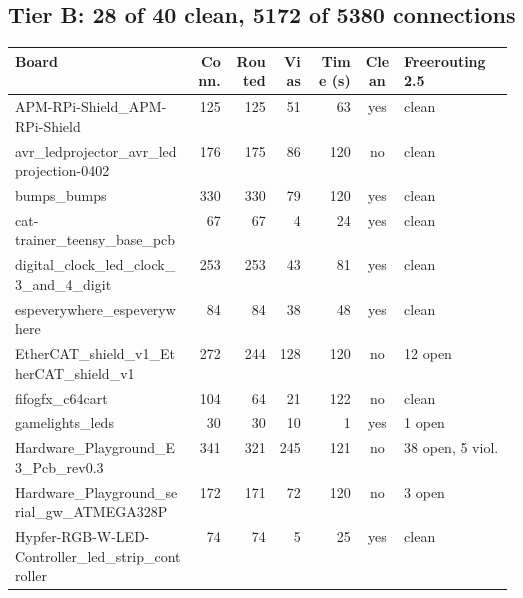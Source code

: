 \subsection*{Tier B: 28 of 40 clean, 5172 of 5380 connections}
\begin{longtable}{@{}p{0.36\linewidth}rrrrcp{0.22\linewidth}@{}}
\toprule Board & Conn. & Routed & Vias & Time (s) & Clean & Freerouting 2.5 \\ \midrule \endhead
APM-\allowbreak{}RPi-\allowbreak{}Shield\_\allowbreak{}APM-\allowbreak{}RPi-\allowbreak{}Shield & 125 & 125 & 51 & 63 & \textcolor{fraqua}{yes} & {\footnotesize clean} \\
avr\_\allowbreak{}ledprojector\_\allowbreak{}avr\_\allowbreak{}ledprojection-\allowbreak{}0402 & 176 & 175 & 86 & 120 & \textcolor{frorange}{no} & {\footnotesize clean} \\
bumps\_\allowbreak{}bumps & 330 & 330 & 79 & 120 & \textcolor{fraqua}{yes} & {\footnotesize clean} \\
cat-\allowbreak{}trainer\_\allowbreak{}teensy\_\allowbreak{}base\_\allowbreak{}pcb & 67 & 67 & 4 & 24 & \textcolor{fraqua}{yes} & {\footnotesize clean} \\
digital\_\allowbreak{}clock\_\allowbreak{}led\_\allowbreak{}clock\_\allowbreak{}3\_\allowbreak{}and\_\allowbreak{}4\_\allowbreak{}digit & 253 & 253 & 43 & 81 & \textcolor{fraqua}{yes} & {\footnotesize clean} \\
espeverywhere\_\allowbreak{}espeverywhere & 84 & 84 & 38 & 48 & \textcolor{fraqua}{yes} & {\footnotesize clean} \\
EtherCAT\_\allowbreak{}shield\_\allowbreak{}v1\_\allowbreak{}EtherCAT\_\allowbreak{}shield\_\allowbreak{}v1 & 272 & 244 & 128 & 120 & \textcolor{frorange}{no} & {\footnotesize 12 open} \\
fifogfx\_\allowbreak{}c64cart & 104 & 64 & 21 & 122 & \textcolor{frorange}{no} & {\footnotesize clean} \\
gamelights\_\allowbreak{}leds & 30 & 30 & 10 & 1 & \textcolor{fraqua}{yes} & {\footnotesize 1 open} \\
Hardware\_\allowbreak{}Playground\_\allowbreak{}E3\_\allowbreak{}Pcb\_\allowbreak{}rev0.3 & 341 & 321 & 245 & 121 & \textcolor{frorange}{no} & {\footnotesize 38 open, 5 viol.} \\
Hardware\_\allowbreak{}Playground\_\allowbreak{}serial\_\allowbreak{}gw\_\allowbreak{}ATMEGA328P & 172 & 171 & 72 & 120 & \textcolor{frorange}{no} & {\footnotesize 3 open} \\
Hypfer-\allowbreak{}RGB-\allowbreak{}W-\allowbreak{}LED-\allowbreak{}Controller\_\allowbreak{}led\_\allowbreak{}strip\_\allowbreak{}controller & 74 & 74 & 5 & 25 & \textcolor{fraqua}{yes} & {\footnotesize clean} \\

\end{longtable}
